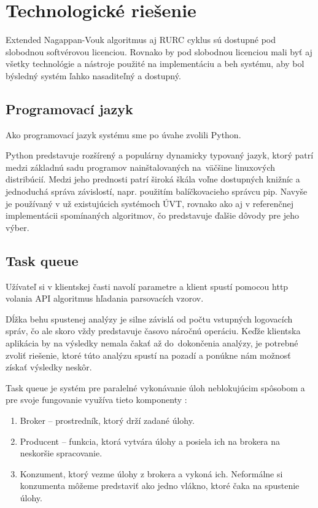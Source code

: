 \section{Technologické riešenie}

Extended Nagappan-Vouk algoritmus aj RURC cyklus sú dostupné pod slobodnou softvérovou licenciou. Rovnako by pod slobodnou licenciou mali byť aj všetky technológie a nástroje použité na implementáciu a beh systému, aby bol býsledný systém ľahko nasaditeľný a dostupný.


\subsection{Programovací jazyk}
Ako programovací jazyk systému sme po úvahe zvolili Python. 
\par Python predstavuje rozšírený a populárny dynamicky typovaný jazyk, ktorý patrí medzi základnú sadu programov nainštalovaných na~väč\-šine linuxových distribúcií. Medzi jeho prednosti patrí široká škála voľne dostupných knižníc a jednoduchá správa závislostí, napr. použitím balíčkovacieho správcu pip. Navyše je používaný v už existujúcich systémoch ÚVT, rovnako ako aj v referenčnej implementácii spomína\-ných algoritmov, čo predstavuje ďalšie dôvody pre jeho výber. 

\subsection{Task queue}
Užívateľ si v klientskej časti navolí parametre a klient spustí pomocou http volania API algoritmus hľadania parsovacích vzorov.
\par Dĺžka behu spustenej analýzy je silne závislá od počtu vstupných logovacích správ, čo ale skoro vždy predstavuje časovo náročnú ope\-ráciu. Keďže klientska aplikácia by na výsledky nemala čakať až do~dokončenia analýzy, je potrebné zvoliť riešenie, ktoré túto analýzu spustí na pozadí a ponúkne nám možnosť získať výsledky neskôr.
\par Task queue je systém pre paralelné vykonávanie úloh neb\-lokujúcim spôsobom a pre svoje fungovanie využíva tieto komponenty :

\begin{enumerate}
  \item Broker -- prostredník, ktorý drží zadané úlohy.
  \item Producent -- funkcia, ktorá vytvára úlohy a posiela ich na brokera na neskoršie spracovanie.
  \item Konzument, ktorý vezme úlohy z brokera a vykoná ich. Neformálne si konzumenta môžeme predstaviť ako jedno vlákno, ktoré čaka na spustenie úlohy.
\end{enumerate}

